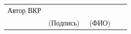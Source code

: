\documentclass[%
]{report}
\begin{document}
\noindent \begin{tabular}{p{0.33\linewidth} p{0.33\linewidth} p{0.33\linewidth}}
Автор ВКР & \underline{\phantom{signature sign}} & \underline{\phantom{Генералов Даниил Михайлович}} \\
& (Подпись) & (ФИО)
\end{tabular}

\thispagestyle{empty} 

\newpage
\setcounter{page}{3}  

\tableofcontents

\newpage







\end{document}
